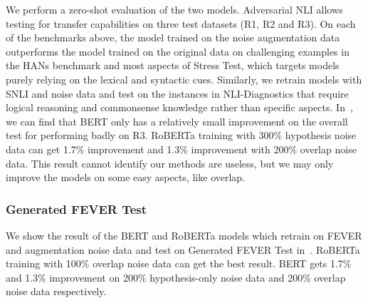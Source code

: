 We perform a zero-shot evaluation of the two models. Adversarial NLI allows testing for transfer
capabilities on three test datasets (R1, R2 and R3).
On each of the benchmarks above, the model trained on the noise augmentation 
data outperforms
the model trained on the original data on challenging examples in the HANs benchmark and 
most aspects of Stress Test, which
targets models purely relying on the lexical and syntactic cues. 
Similarly, we retrain models with SNLI and noise data and test 
on the instances in NLI-Diagnostics that require logical reasoning and 
commonsense knowledge rather than specific aspects. 
In~, we can find that BERT only has a 
relatively small improvement on the overall test for performing badly on R3. 
RoBERTa training with 300\% hypothesis noise data can get 1.7\% 
improvement and 1.3\% improvement with 200\% overlap noise data. 
This result cannot identify our methods are useless, but we may only 
improve the models on some easy aspects, like overlap. 

\subsubsection{Generated FEVER Test} 

We show the result of the BERT and RoBERTa models which retrain on FEVER and 
augmentation noise data and test on Generated FEVER Test in~. 
 RoBERTa training with 100\% overlap noise data can get the best result. BERT gets 1.7\% and 1.3\% 
 improvement on 200\% hypothesis-only noise data and 200\% overlap noise data respectively.
 
